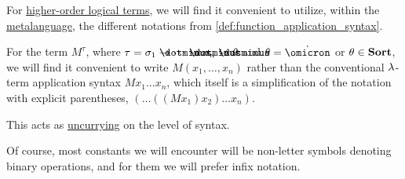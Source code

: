 \begin{remark}\label{rem:quantifiable_type_uncurrying}
  For \hyperref[def:hol_term]{higher-order logical terms}, we will find it convenient to utilize, within the \hyperref[con:metalogic]{metalanguage}, the different notations from \cref{def:function_application_syntax}.

  For the term \( M^\tau \), where \( \tau = \sigma_1 \synimplies \cdots \synimplies \sigma_n \synimplies \theta \) and \( \theta = \syn\omicron \) or \( \theta \in \op*{Sort} \), we will find it convenient to write \( M(x_1, \ldots, x_n) \) rather than the conventional \( {\mathrm \lambda} \)-term application syntax \( M x_1 \ldots x_n \), which itself is a simplification of the notation with explicit parentheses, \( (\ldots ((M x_1) x_2) \ldots x_n) \).

  This acts as \hyperref[def:function_currying]{uncurrying} on the level of syntax.

  Of course, most constants we will encounter will be non-letter symbols denoting binary operations, and for them we will prefer infix notation.
\end{remark}

